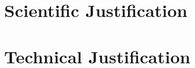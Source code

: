 \documentclass[11pt,a4paper,twoside]{article}
\begin{document}
    

    \section*{Scientific Justification}
    

    \section*{Technical Justification}
    


    
    {
        \footnotesize
        
    }
\end{document}
